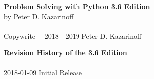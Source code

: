 
\textbf{Problem Solving with Python 3.6 Edition} \\
by Peter D. Kazarinoff \\
\\
Copywrite \  \textcopyright \  2018 - 2019 Peter D. Kazarinoff\\

\vspace{3in}

\textbf{Revision History of the 3.6 Edition}\\
\\
2018-01-09 Initial Release
